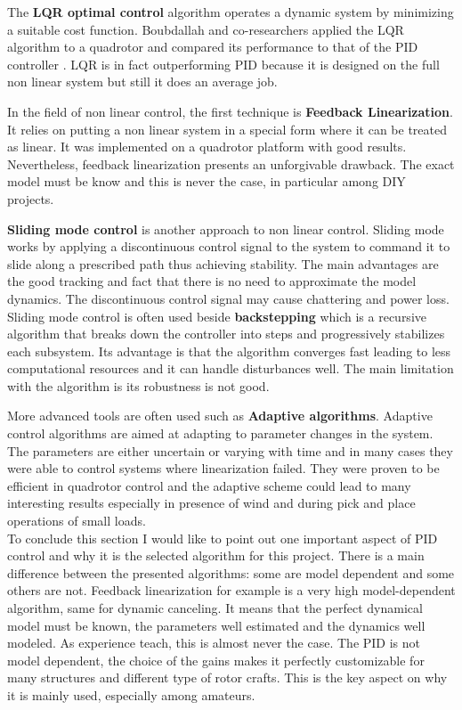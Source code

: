 The \textbf{LQR optimal control} algorithm operates a dynamic system by minimizing a suitable cost function. Boubdallah and co-researchers applied the LQR algorithm to a quadrotor and compared its performance to that of the PID controller \cite{BouabdallahLQR}. LQR is in fact outperforming PID because it is designed on the full non linear system but still it does an average job. \par In the field of non linear control, the first technique is \textbf{Feedback Linearization}. It relies on putting a non linear system in a special form where it can be treated as linear. It was implemented on a quadrotor platform \cite{Altug2002} with good results. Nevertheless, feedback linearization presents an unforgivable drawback. The exact model must be know and this is never the case, in particular among DIY projects.\par \textbf{Sliding mode control} is another approach to non linear control. Sliding mode works by applying a discontinuous control signal to the system to command it to slide along a prescribed path thus achieving stability. The main advantages are the good tracking and  fact that there is no need to approximate the model dynamics. The discontinuous control signal may cause chattering and power loss. Sliding mode control is often used beside \textbf{backstepping} \cite{Bouadi2007} which is a recursive algorithm that breaks down the controller into steps and progressively stabilizes each subsystem. Its advantage is that the algorithm converges fast leading to less computational resources and it can handle disturbances well. The main limitation with the algorithm is its robustness is not good. \par More advanced tools are often used such as \textbf{Adaptive algorithms}. Adaptive control algorithms are aimed at adapting to parameter changes in the system. The parameters are either uncertain or varying with time and in many cases they were able to control systems where linearization failed. They were proven to be efficient in quadrotor control \cite{Antonelli2013} and the adaptive scheme could lead to many interesting results especially in presence of wind and during pick and place operations of small loads.\\ 

\noindent
To conclude this section I would like to point out one important aspect of PID control and why it is the selected algorithm for this project. There is a main difference between the presented algorithms: some are model dependent and some others are not. Feedback linearization for example is a very high model-dependent algorithm, same for dynamic canceling. It means that the perfect dynamical model must be known, the parameters well estimated and the dynamics well modeled. As experience teach, this is almost never the case. The PID is not model dependent, the choice of the gains makes it perfectly customizable for many structures and different type of rotor crafts. This is the key aspect on why it is mainly used, especially among amateurs.

